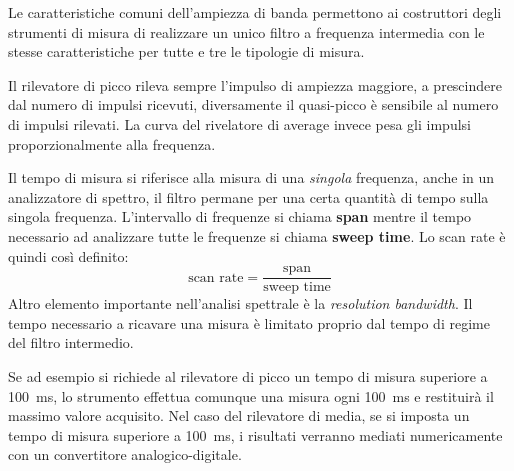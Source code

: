 Le caratteristiche comuni dell'ampiezza di banda permettono ai costruttori degli strumenti
di misura di realizzare un unico filtro a frequenza intermedia con le stesse
caratteristiche per tutte e tre le tipologie di misura.

Il rilevatore di picco rileva sempre l'impulso di ampiezza maggiore, a prescindere
dal numero di impulsi ricevuti, diversamente il quasi-picco è sensibile al numero di impulsi rilevati.
La curva del rivelatore di average invece pesa gli impulsi proporzionalmente alla frequenza.

Il tempo di misura si riferisce alla misura di una \textit{singola} frequenza,
anche in un analizzatore di spettro, il filtro permane per una certa quantità di tempo
sulla singola frequenza. L'intervallo di frequenze si chiama \textbf{span} mentre 
il tempo necessario ad analizzare tutte le frequenze si chiama \textbf{sweep time}.
Lo scan rate è quindi così definito:
$$
 \text{scan rate} = \frac{\text{span}}{\text{sweep time}}
$$
Altro elemento importante nell'analisi spettrale è la \textit{resolution bandwidth}.
Il tempo necessario a ricavare una misura è limitato proprio dal tempo di regime
del filtro intermedio.

Se ad esempio si richiede al rilevatore di picco un tempo di misura
superiore a \SI{100}{\milli\second}, lo strumento effettua comunque una misura
ogni \SI{100}{\milli\second} e restituirà il massimo valore acquisito.
Nel caso del rilevatore di media, se si imposta un tempo di misura superiore
a \SI{100}{\milli\second}, i risultati verranno mediati numericamente con
un convertitore analogico-digitale.

